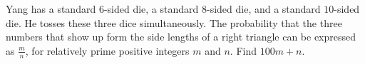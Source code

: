 Yang has a standard $6$-sided die, a standard $8$-sided die, and a standard $10$-sided die. He tosses these three dice simultaneously. The probability that the three numbers that show up form the side lengths of a right triangle can be expressed as $\frac{m}{n}$, for relatively prime positive integers $m$ and $n$. Find $100m+n$.
